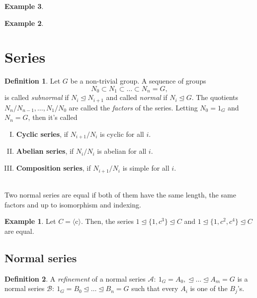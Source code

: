 \documentclass[11pt]{amsbook}%
\newcommand{\ii}{\item}
\theoremstyle{plain}
\theoremstyle{definition}
\newtheorem{definition*}{Definition}
\newtheorem*{example*}{Example}
\numberwithin{equation}{section}
\newcommand{\lrangle}[1]{\langle \text{#1} \rangle}
\newcommand{\leftnormal}{\trianglelefteq}
\begin{document}
\begin{example*}
\begin{example*}
\section{Series}
\begin{definition*}
  Let $G$ be a non-trivial group. A sequence of groups
  $$
  N_{0} \subset N_{1} \subset \dots \subset N_{n} = G,
  $$
  is called \textit{subnormal} if $N_{i} \leftnormal N_{i+1}$ and
  called \textit{normal} if $N_{i} \leftnormal G$.
  The quotients $N_{n}/N_{n-1}, \dots, N_{1}/N_{0}$ are called
  the \textit{factors} of the series.
  Letting $N_{0} = 1_{G}$ and $N_{n} = G$, then it's called
  \begin{enumerate}[I. ]
      \ii \textbf{Cyclic series}, if $N_{i+1}/N_{i}$ is cyclic for all $i$.
      \ii \textbf{Abelian series}, if $N_{i}/N_{i}$ is abelian for all $i$.
      \ii \textbf{Composition series}, if $N_{i+1}/N_{i}$ is simple for all $i$.
  \end{enumerate}
\end{definition*} \\
Two normal series are equal if both of them have the same length, the same
factors and up to isomorphism and indexing.

\begin{example*}
  Let $C = \lrangle{c}$. Then, the series
  $1 \leftnormal \{1, c^{3}\} \leftnormal C$ and $1 \leftnormal \{1, c^{2}, c^{4} \} \leftnormal C$
  are equal.
\end{example*}

\subsection{Normal series}
\begin{definition*}
  A \textit{refinement} of a normal series $\mathcal{A}: \  1_{G} = A_{0}, \leftnormal \dots \leftnormal A_{m} = G$
  is a normal series $\mathcal{B}: \ 1_{G} = B_{0} \leftnormal \dots \leftnormal B_{n} = G$
  such that every $A_{i}$ is one of the $B_{j}$'s.

\end{definition*}


\end{example*}
\end{example*}
\end{document}
